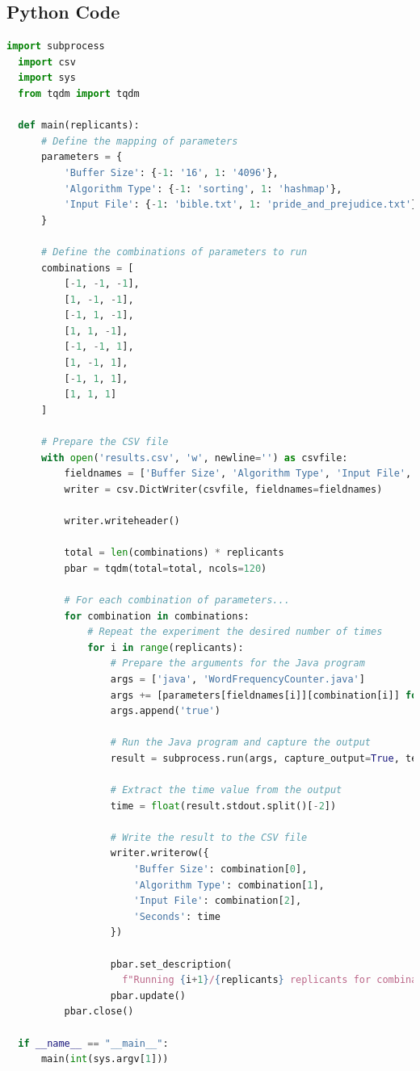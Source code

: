 \documentclass{article}
\begin{document}
\subsection*{Python Code}
\begin{lstlisting}[language=Python, 
  basicstyle=\ttfamily\scriptsize, 
  numbers=none, 
  frame=single,
  showspaces=false,
  caption={Source Code for the run\_java\_experiments.py file}]
  import subprocess
  import csv
  import sys
  from tqdm import tqdm
  
  def main(replicants):
      # Define the mapping of parameters
      parameters = {
          'Buffer Size': {-1: '16', 1: '4096'},
          'Algorithm Type': {-1: 'sorting', 1: 'hashmap'},
          'Input File': {-1: 'bible.txt', 1: 'pride_and_prejudice.txt'}
      }
  
      # Define the combinations of parameters to run
      combinations = [
          [-1, -1, -1],
          [1, -1, -1],
          [-1, 1, -1],
          [1, 1, -1],
          [-1, -1, 1],
          [1, -1, 1],
          [-1, 1, 1],
          [1, 1, 1]
      ]
  
      # Prepare the CSV file
      with open('results.csv', 'w', newline='') as csvfile:
          fieldnames = ['Buffer Size', 'Algorithm Type', 'Input File', 'Seconds']
          writer = csv.DictWriter(csvfile, fieldnames=fieldnames)
  
          writer.writeheader()
  
          total = len(combinations) * replicants
          pbar = tqdm(total=total, ncols=120)
  
          # For each combination of parameters...
          for combination in combinations:
              # Repeat the experiment the desired number of times
              for i in range(replicants):
                  # Prepare the arguments for the Java program
                  args = ['java', 'WordFrequencyCounter.java']
                  args += [parameters[fieldnames[i]][combination[i]] for i in range(len(combination))]
                  args.append('true')
  
                  # Run the Java program and capture the output
                  result = subprocess.run(args, capture_output=True, text=True)
  
                  # Extract the time value from the output
                  time = float(result.stdout.split()[-2])
  
                  # Write the result to the CSV file
                  writer.writerow({
                      'Buffer Size': combination[0],
                      'Algorithm Type': combination[1],
                      'Input File': combination[2],
                      'Seconds': time
                  })
  
                  pbar.set_description(
                    f"Running {i+1}/{replicants} replicants for combination {combination}")
                  pbar.update()
          pbar.close()
  
  if __name__ == "__main__":
      main(int(sys.argv[1]))  
\end{lstlisting}

\end{document}
